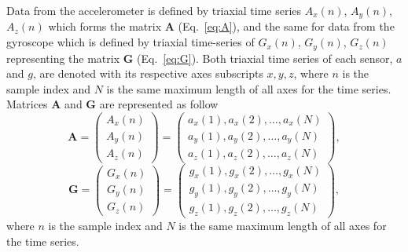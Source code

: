 Data from the accelerometer is defined by triaxial time series $A_x(n)$, $A_y(n)$, $A_z(n)$
which forms the matrix $ \boldsymbol{A}$ (Eq.~\ref{eq:A}), and the same for data from the gyroscope 
which is defined by triaxial time-series of $G_x(n)$, $G_y(n)$, $G_z(n)$ representing 
the matrix $\boldsymbol{G}$ (Eq.~\ref{eq:G}).
Both triaxial time series of each sensor, $a$ and $g$, are denoted with its respective axes 
subscripts $x,y,z$, where $n$ is the sample index  and $N$ is the same maximum length 
of all axes for the time series.
Matrices  $\boldsymbol{A}$ and $\boldsymbol{G}$ are represented as follow
\begin{equation}\label{eq:A}
\boldsymbol{A} =
\begin{pmatrix}
  A_x(n) \\
  A_y(n) \\
  A_z(n)
\end{pmatrix}
=
\begin{pmatrix}
 a_x(1),a_x(2),\dots,a_x(N) \\
 a_y(1),a_y(2),\dots,a_y(N) \\
 a_z(1),a_z(2),\dots,a_z(N) 
\end{pmatrix},
\end{equation}
\begin{equation}\label{eq:G}
\boldsymbol{G} =
\begin{pmatrix}
 G_x(n) \\
 G_y(n) \\
 G_z(n)
\end{pmatrix}
=
\begin{pmatrix}
 g_x(1),g_x(2),\dots,g_x(N) \\
 g_y(1),g_y(2),\dots,g_y(N) \\
 g_z(1),g_z(2),\dots,g_z(N) 
\end{pmatrix},
\end{equation}
where $n$ is the sample index  and $N$ is the same maximum length of all axes for the time series.


